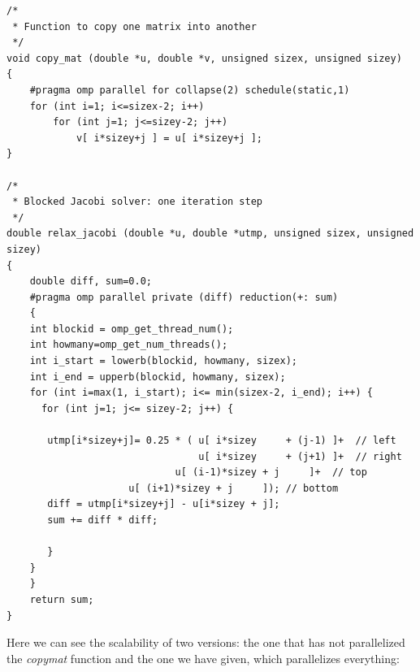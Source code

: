 \documentclass[12]{article}
\begin{document}
\begin{lstlisting}[frame=single]
/*
 * Function to copy one matrix into another
 */
void copy_mat (double *u, double *v, unsigned sizex, unsigned sizey)
{
    #pragma omp parallel for collapse(2) schedule(static,1)
    for (int i=1; i<=sizex-2; i++)
        for (int j=1; j<=sizey-2; j++)
            v[ i*sizey+j ] = u[ i*sizey+j ];
}

/*
 * Blocked Jacobi solver: one iteration step
 */
double relax_jacobi (double *u, double *utmp, unsigned sizex, unsigned sizey)
{
    double diff, sum=0.0;
    #pragma omp parallel private (diff) reduction(+: sum)
    {
    int blockid = omp_get_thread_num();
    int howmany=omp_get_num_threads();
    int i_start = lowerb(blockid, howmany, sizex);
    int i_end = upperb(blockid, howmany, sizex);
    for (int i=max(1, i_start); i<= min(sizex-2, i_end); i++) {
      for (int j=1; j<= sizey-2; j++) {
           
	   utmp[i*sizey+j]= 0.25 * ( u[ i*sizey     + (j-1) ]+  // left
	                             u[ i*sizey     + (j+1) ]+  // right
	                   	     u[ (i-1)*sizey + j     ]+  // top
				     u[ (i+1)*sizey + j     ]); // bottom
	   diff = utmp[i*sizey+j] - u[i*sizey + j];
	   sum += diff * diff; 
             	 
       }
    }
    }
    return sum;
}

\end{lstlisting}


Here we can see the scalability of two versions: the one that has not parallelized the \textit{copymat} function and the one we have given, which parallelizes everything:
\end{document}
